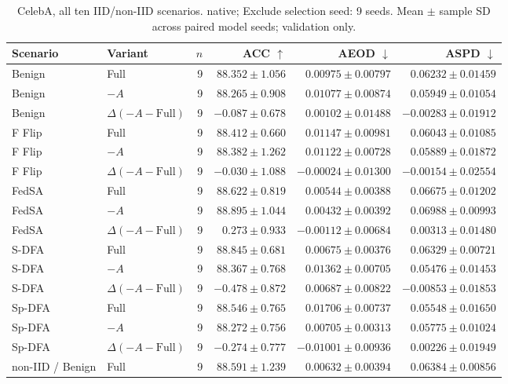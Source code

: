 \begin{table}[t]
\centering
\small
\caption{CelebA, all ten IID/non-IID scenarios. native; Exclude selection seed: 9 seeds. Mean $\pm$ sample SD across paired model seeds; validation only.}
\begin{tabular}{llrrrr}
\toprule
Scenario & Variant & $n$ & ACC $\uparrow$ & AEOD $\downarrow$ & ASPD $\downarrow$ \\
\midrule
Benign & Full & 9 & $88.352 \pm 1.056$ & $0.00975 \pm 0.00797$ & $0.06232 \pm 0.01459$ \\
Benign & $-A$ & 9 & $88.265 \pm 0.908$ & $0.01077 \pm 0.00874$ & $0.05949 \pm 0.01054$ \\
Benign & $\Delta(-A-\mathrm{Full})$ & 9 & $-0.087 \pm 0.678$ & $0.00102 \pm 0.01488$ & $-0.00283 \pm 0.01912$ \\
F Flip & Full & 9 & $88.412 \pm 0.660$ & $0.01147 \pm 0.00981$ & $0.06043 \pm 0.01085$ \\
F Flip & $-A$ & 9 & $88.382 \pm 1.262$ & $0.01122 \pm 0.00728$ & $0.05889 \pm 0.01872$ \\
F Flip & $\Delta(-A-\mathrm{Full})$ & 9 & $-0.030 \pm 1.088$ & $-0.00024 \pm 0.01300$ & $-0.00154 \pm 0.02554$ \\
FedSA & Full & 9 & $88.622 \pm 0.819$ & $0.00544 \pm 0.00388$ & $0.06675 \pm 0.01202$ \\
FedSA & $-A$ & 9 & $88.895 \pm 1.044$ & $0.00432 \pm 0.00392$ & $0.06988 \pm 0.00993$ \\
FedSA & $\Delta(-A-\mathrm{Full})$ & 9 & $0.273 \pm 0.933$ & $-0.00112 \pm 0.00684$ & $0.00313 \pm 0.01480$ \\
S-DFA & Full & 9 & $88.845 \pm 0.681$ & $0.00675 \pm 0.00376$ & $0.06329 \pm 0.00721$ \\
S-DFA & $-A$ & 9 & $88.367 \pm 0.768$ & $0.01362 \pm 0.00705$ & $0.05476 \pm 0.01453$ \\
S-DFA & $\Delta(-A-\mathrm{Full})$ & 9 & $-0.478 \pm 0.872$ & $0.00687 \pm 0.00822$ & $-0.00853 \pm 0.01853$ \\
Sp-DFA & Full & 9 & $88.546 \pm 0.765$ & $0.01706 \pm 0.00737$ & $0.05548 \pm 0.01650$ \\
Sp-DFA & $-A$ & 9 & $88.272 \pm 0.756$ & $0.00705 \pm 0.00313$ & $0.05775 \pm 0.01024$ \\
Sp-DFA & $\Delta(-A-\mathrm{Full})$ & 9 & $-0.274 \pm 0.777$ & $-0.01001 \pm 0.00936$ & $0.00226 \pm 0.01949$ \\
non-IID / Benign & Full & 9 & $88.591 \pm 1.239$ & $0.00632 \pm 0.00394$ & $0.06384 \pm 0.00856$ \\

\end{tabular}
\end{table}
